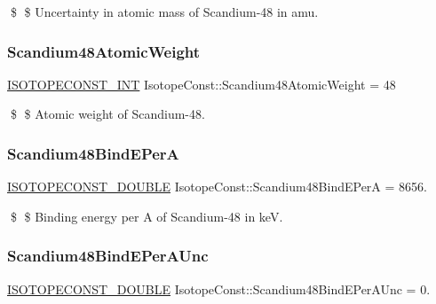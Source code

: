 \$ \$ Uncertainty in atomic mass of Scandium-\/48 in amu. \mbox{\label{group___isotope_const-_scandium-_sc48_ga34315db0c1d7a8a7ded1264133db2ff6}} 
\subsubsection{\texorpdfstring{Scandium48\+Atomic\+Weight}{Scandium48AtomicWeight}}
{\footnotesize\ttfamily \mbox{\hyperlink{group___isotope_const-_macros_ga5f18360b3e99483a35c32d789e62621c}{I\+S\+O\+T\+O\+P\+E\+C\+O\+N\+S\+T\+\_\+\+I\+NT}} Isotope\+Const\+::\+Scandium48\+Atomic\+Weight = 48}

\$ \$ Atomic weight of Scandium-\/48. \mbox{\label{group___isotope_const-_scandium-_sc48_ga560f09fa8203bf6786b9b551bfae9f76}} 
\subsubsection{\texorpdfstring{Scandium48\+Bind\+E\+PerA}{Scandium48BindEPerA}}
{\footnotesize\ttfamily \mbox{\hyperlink{group___isotope_const-_macros_ga8f45a7272ce02c0b4c65c44636ed719a}{I\+S\+O\+T\+O\+P\+E\+C\+O\+N\+S\+T\+\_\+\+D\+O\+U\+B\+LE}} Isotope\+Const\+::\+Scandium48\+Bind\+E\+PerA = 8656.}

\$ \$ Binding energy per A of Scandium-\/48 in keV. \mbox{\label{group___isotope_const-_scandium-_sc48_gaf7df68d094207c944437d2876bc9ca8b}} 
\subsubsection{\texorpdfstring{Scandium48\+Bind\+E\+Per\+A\+Unc}{Scandium48BindEPerAUnc}}
{\footnotesize\ttfamily \mbox{\hyperlink{group___isotope_const-_macros_ga8f45a7272ce02c0b4c65c44636ed719a}{I\+S\+O\+T\+O\+P\+E\+C\+O\+N\+S\+T\+\_\+\+D\+O\+U\+B\+LE}} Isotope\+Const\+::\+Scandium48\+Bind\+E\+Per\+A\+Unc = 0.}

